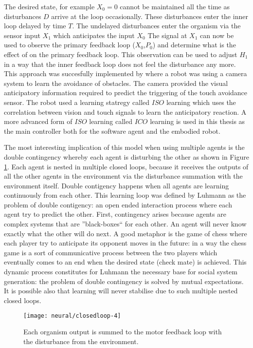 The desired state, for example $X_0=0$ cannot be maintained all the time
as disturbances $D$ arrive at the loop occasionally. These disturbances enter
the inner loop delayed by time $T$. The undelayed disturbances enter the organism
via the sensor input $X_1$ which anticipates the input $X_0$ The signal at $X_1$
can now be used to observe the primary feedback loop ($X_0$,$P_0$) and determine 
what is the effect of on the primary feedback loop. This observation can be used to adjust
$H_1$ in a way that the inner feedback loop does not feel the disturbance any more.
This approach was succesfully implemented by \citet{PorrNecoISO2003} where a 
robot was using a camera system to learn the avoidance of obstacles.
The camera provided the visual anticipatory information required to predict the 
triggering of the touch avoidance sensor.
The robot used a learning statregy called $ISO$ learning which uses the correlation between
 vision and touch signals to learn the anticipatory reaction.
A more advanced form of $ISO$ learning called $ICO$ learning is used in this thesis as the main controller
 both for the software agent and the embodied robot.

The most interesting implication of this model when using multiple agents is the 
double contingency whereby each agent is disturbing the other as shown in Figure 
\ref{Fig:Neural:MutualDisturbance}.
Each agent is nested in multiple closed loops, because it receives the outputs of 
all the other agents in the environment via the disturbance summation with the 
environment itself.
Double contigency happens when all agents are learning continuously from each other.
This learning loop was defined by Luhmann as the problem of double contigency:
an open ended interaction process where each agent try to predict the other.
First, contingency arises because agents are complex systems that are ''black-boxes``
 for each other. An agent will never know exactly what the other will do next.
A good metaphor is the game of chess where each player try to anticipate its opponent 
moves in the future: in a way the chess game is a sort of communicative process between
the two players which eventually comes to an end when the desired state (check mate) 
is achieved.
This dynamic process constitutes for Luhmann the necessary base for social system generation:
the problem of double contingency is solved by mutual expectations.
It is possible also that learning will never stabilise due to such multiple nested
 closed loops.

\begin{figure}[htbp]
\begin{center}
\texttt{[image: neural/closedloop-4]}
\end{center}
\small{
\caption[Double contigency]{
Each organism output is summed to the motor feedback loop with the 
disturbance from the environment.
\label{Fig:Neural:MutualDisturbance}}}
\end{figure} 

